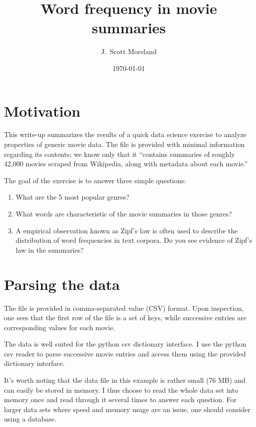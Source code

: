 \documentclass[aps,prc,reprint,amsmath]{revtex4-1}
\begin{document}
\title{Word frequency in movie summaries}

\author{J.\ Scott Moreland}
\date{\today}

\maketitle

\section{Motivation}
This write-up summarizes the results of a quick data science exercise to analyze properties of generic movie data.
The file is provided with minimal information regarding its contents; we know only that it ``contains summaries of roughly 42,000 movies scraped from Wikipedia, along with metadata about each movie.'' 

The goal of the exercise is to answer three simple questions:
\begin{enumerate}
  \item What are the 5 most popular genres?
  \item What words are characteristic of the movie summaries in those genres?
  \item A empirical observation known as Zipf's law is often used to describe the distribution of word frequencies in text corpora. Do you see evidence of Zipf's law in the summaries?
\end{enumerate}

\section{Parsing the data}

The file is provided in comma-separated value (CSV) format. Upon inspection, one sees that the first row of the file is a set of keys, while successive entries are corresponding values for each movie.

The data is well suited for the python csv dictionary interface. I use the python csv reader to parse successive movie entries and access them using the provided dictionary interface. 

It's worth noting that the data file in this example is rather small (76 MB) and can easily be stored in memory. I thus choose to read the whole data set into memory once and read through it several times to answer each question. For larger data sets where speed and memory usage are an issue, one should consider using a database.
\end{document}
